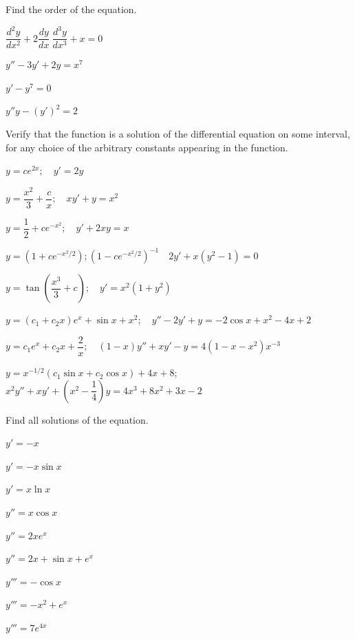 \exercises
\begin{exerciselist}
\item\label{exer:1.2.1}Find the order of the equation.
\begin{alist*}[columns=2]
\item $\dfrac{d^2y}{dx^2}+2\dfrac{dy}{dx}\ \dfrac{d^3y}{dx^3}+x=0$
\item $y''-3y'+2y=x^7$
\item $y'-y^7=0$
\item $y''y-(y')^2=2$
\end{alist*}

\item\label{exer:1.2.2}Verify that the function is a solution of the
differential equation on some interval, for any choice of
the arbitrary constants appearing in the function.

\begin{alist}
\item %
 $y=ce^{2x};     \quad y'=2y$
\item %
 $y=\dfrac{x^2}{3} +\dfrac{c}{x};   \quad xy'+y=x^2$

\item %
$y=\dfrac{1}{2}+ce^{-x^2};    \quad y'+2xy=x$

\item %
$y=(1+ce^{-x^2/2});   (1-ce^{-x^2/2})^{-1}   \quad
2y'+x(y^2-1)=0$

\item %
$y=\tan\left( \dfrac{x^3}{3}+c\right);     \quad
y'=x^2(1+y^2)$

\item %
$y=(c_1+c_2x)e^x+\sin x+x^2;    \quad
y''-2y'+y=-2 \cos x+x^2-4x+2$

\item %
$y=c_1e^x+c_2x+\dfrac{2}{x};     \quad
(1-x)y''+xy'- y=4(1-x-x^2)x^{-3}$

\item %
$y=x^{-1/2}(c_1\sin x+c_2 \cos x)+4x+8$;     \newline
$x^2y''+xy'+\left(x^2-\dfrac{1}{4}\right)y=4x^3+8x^2+3x-2$
\end{alist}

\item\label{exer:1.2.3}Find all solutions of the  equation.
\begin{alist*}[columns=2]
\item $y'=-x$
\item $y'=-x \sin x$
\item $y'=x \ln x$
\item $y''=x \cos x$
\item $y''=2xe^x$
\item $y''=2x+\sin x+e^x$
\item $y'''=-\cos x$
\item $y'''=-x^2+e^x$
\item $y'''=7e^{4x}$
\end{alist*}


\end{exerciselist}
